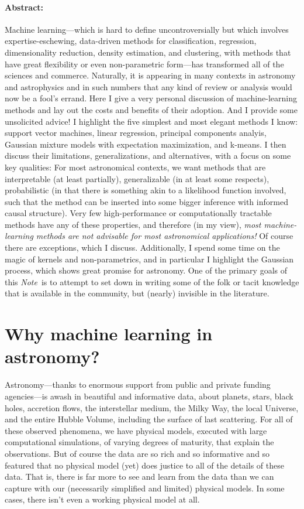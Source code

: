 \documentclass[12pt, twoside, letterpaper]{article}
\newcommand{\documentname}{\textsl{Note}}
\begin{document}
\paragraph{Abstract:}
Machine learning---which is hard to define uncontroversially
but which involves expertise-eschewing, data-driven methods for classification,
regression, dimensionality reduction, density estimation, and clustering,
with methods that have great flexibility or even non-parametric form---has transformed all
of the sciences and commerce.
Naturally, it is appearing in many contexts in astronomy and astrophysics and
in such numbers that any kind of review or analysis would now be a fool's errand.
Here I give a very personal discussion of machine-learning methods and lay out the costs and
benefits of their adoption.
And I provide some unsolicited advice!
I highlight the five simplest and most elegant methods I know: support vector
machines, linear regression, principal components analyis, Gaussian mixture models
with expectation maximization, and k-means.
I then discuss their limitations, generalizations, and alternatives, with a focus
on some key qualities:
For most astronomical contexts, we want methods that are interpretable (at least
partially), generalizable (in at least some respects), probabilistic (in that
there is something akin to a likelihood function involved, such that the method can
be inserted into some bigger inference with informed causal structure).
Very few high-performance or computationally tractable methods have any of these
properties, and therefore (in my view),
\emph{most machine-learning methods are not advisable for most astronomical
applications!}
Of course there are exceptions, which I discuss.
Additionally, I spend some time on the magic of kernels and non-parametrics, and in particular
I highlight the Gaussian process, which shows great promise for astronomy.
One of the primary goals of this \documentname\ is to attempt to set down in writing
some of the folk or tacit knowledge that is available in the community, but
(nearly) invisible in the literature.

\clearpage\section{Why machine learning in astronomy?}

Astronomy---thanks to enormous support from public and private funding
agencies---is awash in beautiful and informative data, about planets, stars,
black holes, accretion flows,
the interstellar medium, the Milky Way, the local Universe, and the entire
Hubble Volume, including the surface of last scattering.
For all of these observed phenomena, we have physical models, executed
with large computational simulations, of varying degrees of maturity,
that explain the observations.
But of course the data are so rich and so informative and so featured
that no physical model (yet) does justice to all of the details of these
data.
That is, there is far more to see and learn from the data than we can
capture with our (necessarily simplified and limited) physical models.
In some cases, there isn't even a working physical model at all.
\end{document}
